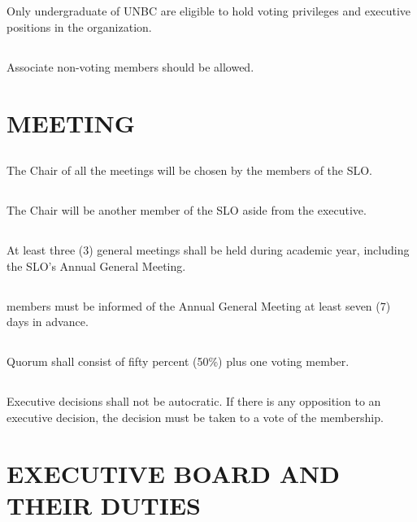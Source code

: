 \documentclass{article}
\begin{document}
\subsection{}
Only undergraduate of UNBC are eligible to hold voting privileges and executive positions in the organization.
\subsection{}
Associate non-voting members should be allowed.
\section{MEETING}
\subsection{}
The Chair of all the meetings will be chosen by the members of the SLO.
\subsection{}
The Chair will be another member of the SLO aside from the executive.
\subsection{}
At least three (3) general meetings shall be held during academic year, including the SLO's Annual General Meeting.
\subsection{}
members must be informed of the Annual General Meeting at least seven (7) days in advance.
\subsection{}
Quorum shall consist of fifty percent (50\%) plus one voting member.
\subsection{}
Executive decisions shall not be autocratic. If there is any opposition to an executive decision, the decision must be taken to a vote of the membership.
\section{EXECUTIVE BOARD AND THEIR DUTIES}
\end{document}
